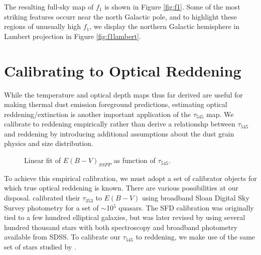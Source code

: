 \documentclass{emulateapj}
\begin{document}
The resulting full-sky map of $f_1$ is shown in Figure \ref{fig:f1}. Some of 
the most striking features occurr near the north Galactic pole, and to 
highlight these regions of unusually high $f_1$, we display the northern
Galactic hemisphere in Lambert projection in Figure \ref{fig:f1lambert}.
 

\section{Calibrating to Optical Reddening}
\label{sec:ebv}

While the temperature and optical depth maps thus far derived are
useful for making thermal dust emission foreground predictions, estimating 
optical reddening/extinction is another important application of the 
$\tau_{545}$ map. We calibrate to reddening empirically rather than derive
a relationshp between $\tau_{545}$ and reddening by introducing additional 
assumptions about the dust grain physics and size distribution.

\begin{figure}
\begin{center}
\caption{\label{fig:calib} Linear fit of $E(B-V)_{SSPP}$ as function of
$\tau_{545}$.}
\end{center}
\end{figure}

To achieve this empirical calibration, we must adopt a set of calibrator
objects for which true optical reddening is known. There are various 
possibilities at our disposal. \cite{planckdust} calibrated their $\tau_{353}$ 
to $E(B-V)$ using broadband Sloan Digital Sky Survey \citep[SDSS;][]{sdss} 
photometry for a set of $\sim$10$^5$ quasars. The SFD calibration was 
originally tied to a few hundred elliptical galaxies, but was later revised by 
\cite{schlafly11} using several hundred thousand stars with both spectroscopy 
and broadband photometry available from SDSS. To calibrate our $\tau_{545}$ to 
reddening, we make use of the same set of stars studied by \cite{schlafly11}.


\end{document}
